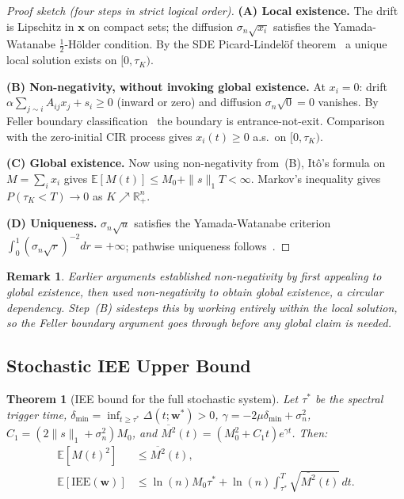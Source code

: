 \documentclass[conference]{IEEEtran}
\newcommand{\bfw}{\mathbf{w}}
\newcommand{\bfx}{\mathbf{x}}
\newcommand{\IEE}{\mathrm{IEE}}
\newtheorem{theorem}{Theorem}
\newtheorem{remark}{Remark}
\begin{document}
\begin{proof}[Proof sketch (four steps in strict logical order)]
\textbf{(A) Local existence.}
The drift is Lipschitz in $\bfx$ on compact sets; the diffusion
$\sigma_n\sqrt{x_i}$ satisfies the Yamada-Watanabe
$\tfrac{1}{2}$-H\"{o}lder condition.  By the SDE
Picard-Lindel\"{o}f theorem~\cite{oksendal2003stochastic} a unique
local solution exists on $[0,\tau_K)$.

\textbf{(B) Non-negativity, without invoking global existence.}
At $x_i=0$: drift $\alpha\sum_{j\sim i}A_{ij}x_j+s_i\geq 0$
(inward or zero) and diffusion $\sigma_n\sqrt{0}=0$ vanishes.
By Feller boundary classification~\cite{feller1951two} the boundary
is entrance-not-exit.  Comparison with the zero-initial CIR process
gives $x_i(t)\geq 0$ a.s.\ on $[0,\tau_K)$.

\textbf{(C) Global existence.}
Now using non-negativity from~(B), It\^{o}'s formula on
$M=\sum_i x_i$ gives $\mathbb{E}[M(t)]\leq M_0+\|s\|_1 T<\infty$.
Markov's inequality gives $P(\tau_K<T)\to 0$ as
$K\nearrow\mathbb{R}^n_+$.

\textbf{(D) Uniqueness.}
$\sigma_n\sqrt{u}$ satisfies the Yamada-Watanabe criterion
$\int_0^1(\sigma_n\sqrt{r})^{-2}dr=+\infty$; pathwise uniqueness
follows~\cite{revuzyor1999}.
\end{proof}

\begin{remark}
Earlier arguments established non-negativity by first appealing
to global existence, then used non-negativity to obtain global
existence, a circular dependency.  Step~(B) sidesteps this by
working entirely within the local solution, so the Feller
boundary argument goes through before any global claim is needed.
\end{remark}

\subsection{Stochastic IEE Upper Bound}

\begin{theorem}[IEE bound for the full stochastic system]
\label{thm:iee_bound}
Let $\tau^*$ be the spectral trigger time,
$\delta_{\min}=\inf_{t\geq\tau^*}\Delta(t;\bfw^*)>0$,
$\gamma=-2\mu\delta_{\min}+\sigma_n^2$,
$C_1=(2\|s\|_1+\sigma_n^2)M_0$, and
$\overline{M^2}(t)=(M_0^2+C_1 t)e^{\gamma t}$.  Then:
\begin{align}
  \mathbb{E}[M(t)^2]&\leq\overline{M^2}(t),\\
  \mathbb{E}[\IEE(\bfw)]&\leq\ln(n)M_0\tau^*
    +\ln(n)\!\int_{\tau^*}^T\!\sqrt{\overline{M^2}(t)}\,dt.
\end{align}
\end{theorem}
\end{document}

